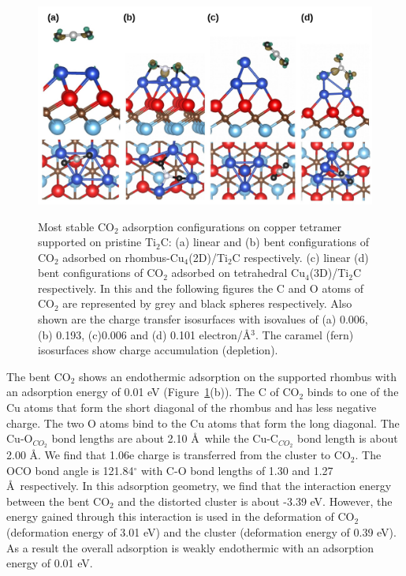\begin{figure}[ht]
 \begin{center}	
    \includegraphics[width=13cm]{./Appendix2/Appendix2_figures/figure7.jpg} \\[0cm]
 \end{center}
 \caption{Most stable CO$_2$ adsorption configurations on copper tetramer supported on pristine Ti$_2$C: (a) linear and (b) bent configurations of CO$_2$ adsorbed on rhombus-Cu$_4$(2D)/Ti$_2$C respectively.
 (c) linear (d) bent configurations of CO$_2$ adsorbed on tetrahedral Cu$_4$(3D)/Ti$_2$C respectively.
 In this and the following figures the C and O atoms of CO$_2$ are represented by grey and black spheres
 respectively.
 Also shown are the charge transfer isosurfaces with isovalues of (a) 0.006, (b) 0.193, (c)0.006 and
 (d) 0.101 electron/Å$^3$. The caramel (fern) isosurfaces show charge accumulation (depletion).}
  \label{co2_ti2c}
\end{figure}

The bent CO$_2$ shows an endothermic adsorption on the supported rhombus with an adsorption energy of 0.01 eV (Figure~\ref{co2_ti2c}(b)). The C of CO$_2$ binds to one of the Cu atoms that form the short diagonal of the rhombus and has less negative charge. The two O atoms
bind to the Cu atoms that form the long diagonal. The Cu-O$_{CO_2}$ bond lengths are about 2.10 \AA~while
the Cu-C$_{CO_2}$ bond length is about 2.00 \AA. We find that 1.06e charge is 
transferred from the cluster to CO$_2$. The OCO bond angle is 121.84$^{\circ}$ with C-O
bond lengths of 1.30 and 1.27 \AA~respectively. In this adsorption geometry, we find that the interaction
energy between the bent CO$_2$ and the distorted cluster is about -3.39 eV. However, the energy gained
through this interaction is used in the deformation of CO$_2$ (deformation energy of 3.01 eV) and the cluster
(deformation energy of 0.39 eV). As a result the overall adsorption is weakly endothermic with an
adsorption energy of 0.01 eV.

